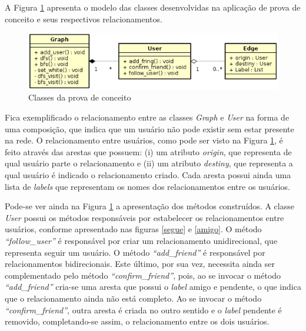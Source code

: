 \begin{apendicesenv}
A Figura \ref{modelo prova de conceito} apresenta o modelo das classes desenvolvidas na aplicação de prova de conceito e seus respectivos relacionamentos.

\begin{figure}[!h]
	\centering
	\includegraphics[scale=0.8]{figuras/capitulo5/classes_prova_conceito.eps}
	\caption{Classes da prova de conceito}
	\label{modelo prova de conceito}
\end{figure}

Fica exemplificado o relacionamento entre as classes \textit{Graph} e \textit{User} na forma de uma composição, que indica que um usuário não pode existir sem estar presente na rede. O relacionamento entre usuários, como pode ser visto na Figura \ref{modelo prova de conceito}, é feito através das arestas que possuem: (i) um atributo \textit{origin}, que representa de qual usuário parte o relacionamento e (ii) um atributo \textit{destiny}, que representa a qual usuário é indicado o relacionamento criado. Cada aresta possui ainda uma lista de \textit{labels} que representam os nomes dos relacionamentos entre os usuários.

Pode-se ver ainda na Figura \ref{modelo prova de conceito} a apresentação dos métodos construídos. A classe \textit{User} possui os métodos responsáveis por estabelecer os relacionamentos entre usuários, conforme apresentado nas figuras \ref{segue} e \ref{amigo}. O método \textit{``follow\_user''} é responsável por criar um relacionamento unidirecional, que representa seguir um usuário. O método \textit{``add\_friend''} é responsável por relacionamentos bidirecionais. Este último, por sua vez, necessita ainda ser complementado pelo método \textit{``confirm\_friend''}, pois, ao se invocar o método \textit{``add\_friend''} cria-se uma aresta que possui o \textit{label} amigo e pendente, o que indica que o relacionamento ainda não está completo. Ao se invocar o método \textit{``confirm\_friend''}, outra aresta é criada no outro sentido e o \textit{label} pendente é removido, completando-se assim, o relacionamento entre os dois usuários.


\end{apendicesenv}

